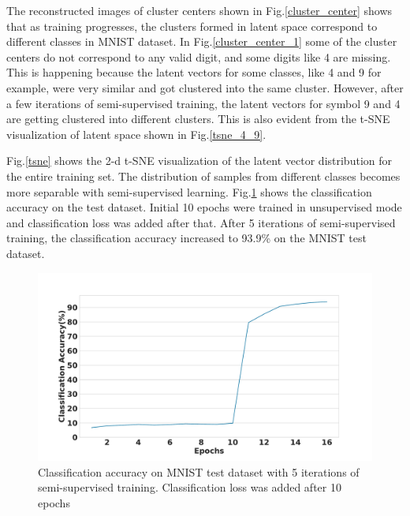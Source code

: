\documentclass[runningheads]{llncs}
\begin{document}
The reconstructed images of cluster centers shown in Fig.\ref{cluster_center} shows that as training progresses, the clusters formed in latent space correspond to different classes in MNIST dataset.
In Fig.\ref{cluster_center_1} some of the cluster centers do not correspond to any valid digit, and some digits like 4  are missing.
This is happening because the latent vectors for some classes, like  4 and 9 for example,  were very similar and got clustered into the same cluster.
However, after a few iterations of semi-supervised training, the latent vectors for symbol 9 and 4 are getting clustered into different clusters.
This is also evident from the t-SNE visualization of latent space shown in Fig.\ref{tsne_4_9}.

Fig.\ref{tsne} shows the 2-d t-SNE visualization of the latent vector distribution for the entire training set.
The distribution of samples from different classes becomes more separable with semi-supervised learning.
Fig.\ref{classificaion_acc} shows the  classification accuracy on the test dataset.
Initial 10 epochs were trained in unsupervised mode and classification loss was added after that.
After 5 iterations of semi-supervised training, the classification accuracy increased to 93.9\% on the MNIST test dataset.

\begin{figure}[!t]
\centering
  \centering
  \includegraphics[width=.6\linewidth]{images/classification_acc_semi_supervised}
\caption{Classification accuracy on MNIST test dataset with 5 iterations of semi-supervised training. Classification loss was added after 10 epochs}
\label{classificaion_acc}
\end{figure}
\end{document}
